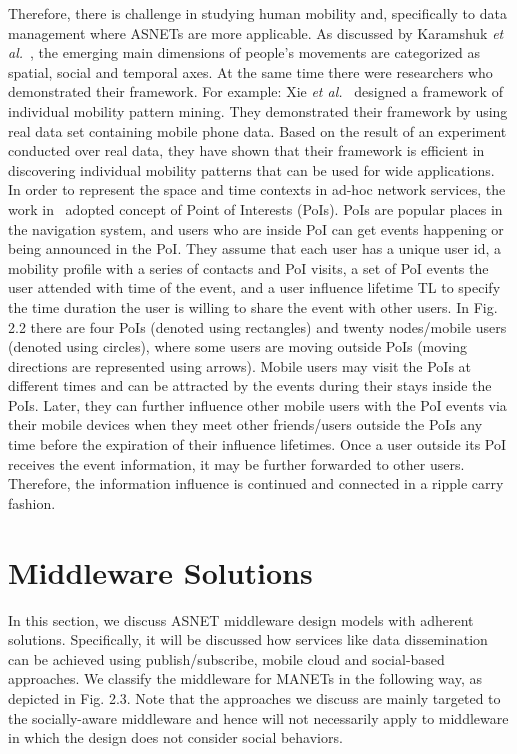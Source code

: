 Therefore, there is challenge in studying human mobility and, specifically to data management where ASNETs are more applicable. As discussed by Karamshuk {\it et al.}~\cite{DKaramshuk2011}, the emerging main dimensions of people's movements are categorized as spatial, social and temporal axes. At the same time there were researchers who demonstrated their framework. For example: Xie {\it et al.}~\cite{RXie2011} designed a framework of individual mobility pattern mining. They demonstrated their framework by using real data set containing mobile phone data. Based on the result of an experiment conducted over real data, they have shown that their framework is efficient in discovering individual mobility patterns that can be used for wide applications. In order to represent the space and time contexts in ad-hoc network services, the work in~\cite{NYu2013} adopted concept of Point of Interests (PoIs). PoIs are popular places in the navigation system, and users who are inside PoI can get events happening or being announced in the PoI. They assume that each user has a unique user id, a mobility profile with a series of contacts and PoI visits, a set of PoI events the user attended with time of the event, and a user influence lifetime TL to specify the time duration the user is willing to share the event with other users. In Fig. 2.2 there are four PoIs (denoted using rectangles) and twenty nodes/mobile users (denoted using circles), where some users are moving outside PoIs (moving directions are represented using arrows). Mobile users may visit the PoIs at different times and can be attracted by the events during their stays inside the PoIs. Later, they can further influence other mobile users with the PoI events via their mobile devices when they meet other friends/users outside the PoIs any time before the expiration of their influence lifetimes. Once a user outside its PoI receives the event information, it may be further forwarded to other users. Therefore, the information influence is continued and connected in a ripple carry fashion.

\section{Middleware Solutions}\label{Chap2_03}
In this section, we discuss ASNET middleware design models with adherent solutions. Specifically, it will be discussed how services like data dissemination can be achieved using publish/subscribe, mobile cloud and social-based approaches. We classify the middleware for MANETs in the following way, as depicted in Fig. 2.3. Note that the approaches we discuss are mainly targeted to the socially-aware middleware and hence will not necessarily apply to middleware in which the design does not consider social behaviors.

